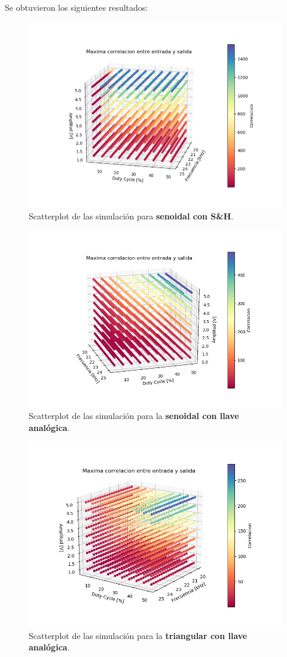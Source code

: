Se obtuvieron los siguientes resultados:
\begin{figure}[H]
\centering
	\includegraphics[width=0.8\linewidth]{ImagenesEjercicio6/scatter_sh_seno.png}
	\caption{Scatterplot de las simulación para \textbf{senoidal con S\&H}.}
	\label{seno_sh}
\end{figure}

\begin{figure}[H]
\centering
	\includegraphics[width=0.8\linewidth]{ImagenesEjercicio6/scatter_llave_seno.png}
	\caption{Scatterplot de las simulación para la \textbf{senoidal con llave analógica}.}
	\label{seno_llave}
\end{figure}

\begin{figure}[H]
\centering
	\includegraphics[width=0.8\linewidth]{ImagenesEjercicio6/scatter_llave_triang.png}
	\caption{Scatterplot de las simulación para la \textbf{triangular con llave analógica}.}
	\label{triang_llave}
\end{figure}

